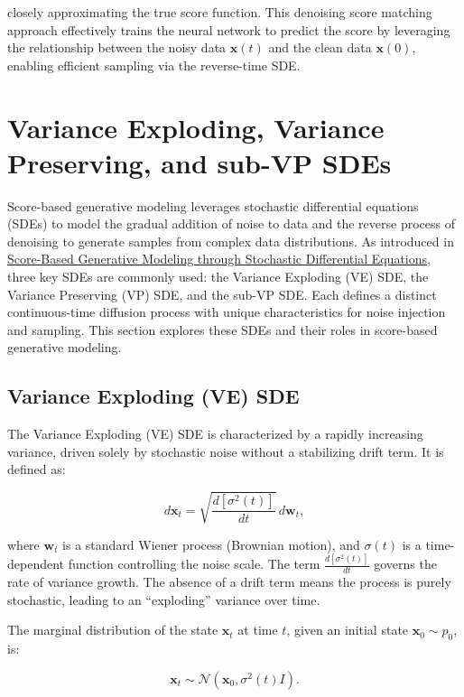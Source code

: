 \documentclass[12pt]{article}
\begin{document}
closely approximating the true score function. This denoising score matching approach effectively trains the neural network to predict the score by leveraging the relationship between the noisy data $\mathbf{x}(t)$ and the clean data $\mathbf{x}(0)$, enabling efficient sampling via the reverse-time SDE.


\section{Variance Exploding, Variance Preserving, and sub-VP SDEs}

Score-based generative modeling leverages stochastic differential equations (SDEs) to model the gradual addition of noise to data and the reverse process of denoising to generate samples from complex data distributions. As introduced in \href{https://arxiv.org/abs/2011.13456}{Score-Based Generative Modeling through Stochastic Differential Equations}, three key SDEs are commonly used: the Variance Exploding (VE) SDE, the Variance Preserving (VP) SDE, and the sub-VP SDE. Each defines a distinct continuous-time diffusion process with unique characteristics for noise injection and sampling. This section explores these SDEs and their roles in score-based generative modeling.

\subsection{Variance Exploding (VE) SDE}

The Variance Exploding (VE) SDE is characterized by a rapidly increasing variance, driven solely by stochastic noise without a stabilizing drift term. It is defined as:

\begin{equation}
    d\mathbf{x}_t = \sqrt{\frac{d[\sigma^2(t)]}{dt}} \, d\mathbf{w}_t,
\end{equation}

where $\mathbf{w}_t$ is a standard Wiener process (Brownian motion), and $\sigma(t)$ is a time-dependent function controlling the noise scale. The term $\frac{d[\sigma^2(t)]}{dt}$ governs the rate of variance growth. The absence of a drift term means the process is purely stochastic, leading to an ``exploding'' variance over time.

The marginal distribution of the state $\mathbf{x}_t$ at time $t$, given an initial state $\mathbf{x}_0 \sim p_0$, is:

\begin{equation}
    \mathbf{x}_t \sim \mathcal{N}\left(\mathbf{x}_0, \sigma^2(t) I\right).
\end{equation}
\end{document}
